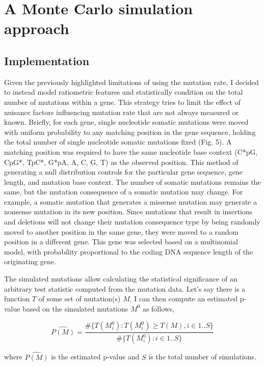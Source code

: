 \section{A Monte Carlo simulation approach}
\label{sec:monte_carlo}

\subsection{Implementation}

Given the previously highlighted limitations of using the mutation rate, I decided to instead model ratiometric features and statistically condition on the total number of mutations within a gene. This strategy tries to limit the effect of nuisance factors influencing mutation rate that are not always measured or known. Briefly, for each gene, single nucleotide somatic mutations were moved with uniform probability to any matching position in the gene sequence, holding the total number of single nucleotide somatic mutations fixed (Fig. 5). A matching position was required to have the same nucleotide base context (C*pG, CpG*, TpC*, G*pA, A, C, G, T) as the observed position. This method of generating a null distribution controls for the particular gene sequence, gene length, and mutation base context. The number of somatic mutations remains the same, but the mutation consequence of a somatic mutation may change. For example, a somatic mutation that generates a missense mutation may generate a nonsense mutation in its new position. Since mutations that result in insertions and deletions will not change their mutation consequence type by being randomly moved to another position in the same gene, they were moved to a random position in a different gene. This gene was selected based on a multinomial model, with probability proportional to the coding DNA sequence length of the originating gene.

The simulated mutations allow calculating the statistical significance of an arbitrary test statistic computed from the mutation data. Let's say there is a function $T$ of some set of mutation(s) $M$. I can then compute an estimated p-value based on the simulated mutations $M^0$ as follows,

\begin{equation}
\hat{P(M)} = \frac{\#\{T(M^0_i) : T(M^0_i) \geq T(M), i \in 1..S\}}{\#\{T(M^0_i) : i \in 1..S\}}
\end{equation}

where $\hat{P(M)}$ is the estimated p-value and $S$ is the total number of simulations. 

